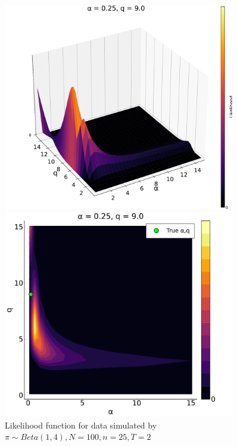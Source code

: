 \documentclass[a4paper, 12pt]{article}
\begin{document}
\begin{figure}
    \centering
    \begin{minipage}{0.55\textwidth}
        \centering
        \includegraphics[width=0.9\textwidth]{../figures/Likelihood_sfplt_0.25.pdf} %
    \end{minipage}\hfill
    \begin{minipage}{0.45\textwidth}
        \centering
        \includegraphics[width=0.9\textwidth]{../figures/Likelihood_contplt_0.25.pdf} %
    \end{minipage}
    \caption{\small Likelihood function for data simulated by $\pi \sim Beta(1, 4), N = 100, n = 25, T = 2$}
\end{figure}
\end{document}
